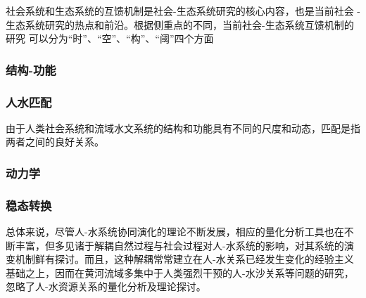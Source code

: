 社会系统和生态系统的互馈机制是社会-生态系统研究的核心内容，也是当前社会 -生态系统研究的热点和前沿。根据侧重点的不同，当前社会-生态系统互馈机制的研究 可以分为“时”、“空”、“构”、“阈”四个方面


\subsubsection*{结构-功能}

\subsubsection*{人水匹配}
由于人类社会系统和流域水文系统的结构和功能具有不同的尺度和动态，匹配是指两者之间的良好关系。

\subsubsection*{动力学}

\subsubsection*{稳态转换}

总体来说，尽管人-水系统协同演化的理论不断发展，相应的量化分析工具也在不断丰富，但多见诸于解耦自然过程与社会过程对人-水系统的影响，对其系统的演变机制鲜有探讨。而且，这种解耦常常建立在人-水关系已经发生变化的经验主义基础之上，因而在黄河流域多集中于人类强烈干预的人-水沙关系等问题的研究，忽略了人-水资源关系的量化分析及理论探讨。